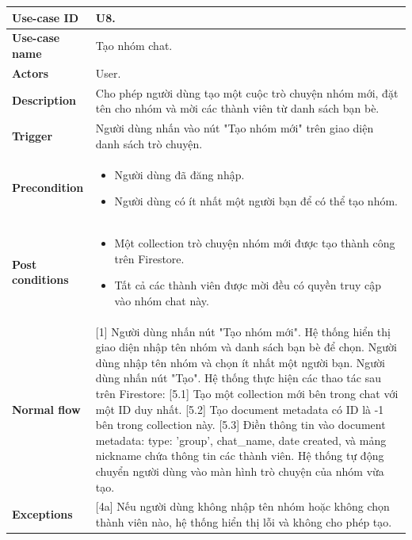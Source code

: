 \documentclass[a4paper, 12pt]{article}
\begin{document}
	\begin{longtable}{|p{3.5cm}|p{12cm}|}
		\hline
		\textbf{Use-case ID} & U8. \\
		\hline
		\textbf{Use-case name} & Tạo nhóm chat. \\
		\hline
		\textbf{Actors} & User. \\
		\hline
		\textbf{Description} & Cho phép người dùng tạo một cuộc trò chuyện nhóm mới, đặt tên cho nhóm và mời các thành viên từ danh sách bạn bè. \\
		\hline
		\textbf{Trigger} & Người dùng nhấn vào nút "Tạo nhóm mới" trên giao diện danh sách trò chuyện. \\
		\hline
		\textbf{Precondition} & 
		\begin{itemize}[nosep, leftmargin=*, label=+]
			\item Người dùng đã đăng nhập.
			\item Người dùng có ít nhất một người bạn để có thể tạo nhóm.
		\end{itemize} \\
		\hline
		\textbf{Post conditions} & 
		\begin{itemize}[nosep, leftmargin=*, label={-}]
			\item Một collection trò chuyện nhóm mới được tạo thành công trên Firestore.
			\item Tất cả các thành viên được mời đều có quyền truy cập vào nhóm chat này.
		\end{itemize} \\
		\hline
		\textbf{Normal flow} & 
		[1] Người dùng nhấn nút "Tạo nhóm mới". \newline
		[2] Hệ thống hiển thị giao diện nhập tên nhóm và danh sách bạn bè để chọn. \newline
		[3] Người dùng nhập tên nhóm và chọn ít nhất một người bạn. \newline
		[4] Người dùng nhấn nút "Tạo". \newline
		[5] Hệ thống thực hiện các thao tác sau trên Firestore: \newline
		\hspace*{0.5cm} [5.1] Tạo một collection mới bên trong chat với một ID duy nhất. \newline
		\hspace*{0.5cm} [5.2] Tạo document metadata có ID là -1 bên trong collection này. \newline
		\hspace*{0.5cm} [5.3] Điền thông tin vào document metadata: type: 'group', chat\_name, date created, và mảng nickname chứa thông tin các thành viên. \newline
		[6] Hệ thống tự động chuyển người dùng vào màn hình trò chuyện của nhóm vừa tạo. \\
		\hline
		\textbf{Exceptions} & [4a] Nếu người dùng không nhập tên nhóm hoặc không chọn thành viên nào, hệ thống hiển thị lỗi và không cho phép tạo. \\
		\hline
	\end{longtable}
	\vspace{0.5cm}
	
\end{document}
